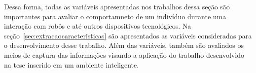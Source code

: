 Dessa forma, todas as variáveis apresentadas nos trabalhos dessa seção são importantes para avaliar o comportamneto de um indivíduo durante uma interação com robôs e até outros dispositivos tecnológicos. Na seção~\ref{sec:extracaocaracteristicas} são apresentados as variáveis consideradas para o desenvolvimento desse trabalho. Além das variáveis, também são avaliados os meios de captura das informações visando a aplicação do trabalho desenvolvido na tese inserido em um ambiente inteligente.
